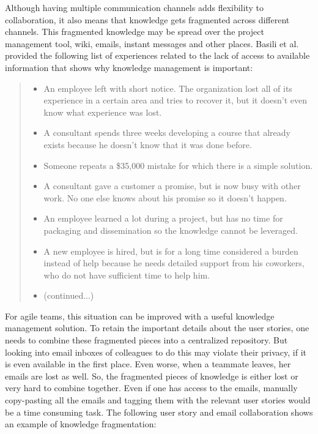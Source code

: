 Although having multiple communication channels adds flexibility to collaboration, it also means that knowledge gets fragmented across different channels. This fragmented knowledge may be spread over the project management tool, wiki, emails, instant messages and other places. Basili et al. provided the following list of experiences related to the lack of access to available information that shows why knowledge management is important\cite{implementing_an_experience}:

\begin{quote}
\begin{itemize}
	\item An employee left with short notice. The organization lost all of its experience in a certain area and tries to recover it, but it doesn't even know what experience was lost.
	
	\item A consultant spends three weeks developing a course that already exists because he doesn't know that it was done before.
	\item Someone repeats a \$35,000 mistake for which there is a simple solution.
	\item A consultant gave a customer a promise, but is now busy with other work. No one else knows about his promise so it doesn't happen.
	\item An employee learned a lot during a project, but has no time for packaging and dissemination so the knowledge cannot be leveraged.
	\item A new employee is hired, but is for a long time considered a burden instead of help because he needs detailed support from his coworkers, who do not have sufficient time to help him.
	\item (continued...)
\end{itemize}                               
\end{quote}


For agile teams, this situation can be improved with a useful knowledge management solution. To retain the important details about the user stories, one needs to combine these fragmented pieces into a centralized repository. But looking into email inboxes of colleagues to do this may violate their privacy, if it is even available in the first place. Even worse, when a teammate leaves, her emails are lost as well. So, the fragmented pieces of knowledge is either lost or very hard to combine together. Even if one has access to the emails, manually copy-pasting all the emails and tagging them with the relevant user stories would be a time consuming task. The following user story and email collaboration shows an example of knowledge fragmentation:

